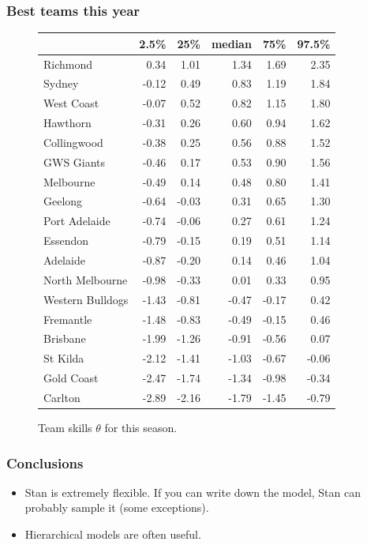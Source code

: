 \documentclass{beamer}
\begin{document}
\begin{frame}
	\frametitle{Best teams this year}
	\begin{figure}
	\tiny
	\begin{tabular}{lrrrrr}
\toprule
{} &  2.5\% &   25\% &  median &   75\% &  97.5\% \\
\midrule
Richmond         &  0.34 &  1.01 &    1.34 &  1.69 &   2.35 \\
Sydney           & -0.12 &  0.49 &    0.83 &  1.19 &   1.84 \\
West Coast       & -0.07 &  0.52 &    0.82 &  1.15 &   1.80 \\
Hawthorn         & -0.31 &  0.26 &    0.60 &  0.94 &   1.62 \\
Collingwood      & -0.38 &  0.25 &    0.56 &  0.88 &   1.52 \\
GWS Giants       & -0.46 &  0.17 &    0.53 &  0.90 &   1.56 \\
Melbourne        & -0.49 &  0.14 &    0.48 &  0.80 &   1.41 \\
Geelong          & -0.64 & -0.03 &    0.31 &  0.65 &   1.30 \\
Port Adelaide    & -0.74 & -0.06 &    0.27 &  0.61 &   1.24 \\
Essendon         & -0.79 & -0.15 &    0.19 &  0.51 &   1.14 \\
Adelaide         & -0.87 & -0.20 &    0.14 &  0.46 &   1.04 \\
North Melbourne  & -0.98 & -0.33 &    0.01 &  0.33 &   0.95 \\
Western Bulldogs & -1.43 & -0.81 &   -0.47 & -0.17 &   0.42 \\
Fremantle        & -1.48 & -0.83 &   -0.49 & -0.15 &   0.46 \\
Brisbane         & -1.99 & -1.26 &   -0.91 & -0.56 &   0.07 \\
St Kilda         & -2.12 & -1.41 &   -1.03 & -0.67 &  -0.06 \\
Gold Coast       & -2.47 & -1.74 &   -1.34 & -0.98 &  -0.34 \\
Carlton          & -2.89 & -2.16 &   -1.79 & -1.45 &  -0.79 \\
\bottomrule
\end{tabular}	
\caption{Team skills $\theta$ for this season.}
\end{figure}
\end{frame}

\begin{frame}
\frametitle{Conclusions}
\begin{itemize}
	\item Stan is extremely flexible. If you can write down the model, Stan can probably sample it (some exceptions).
	\item Hierarchical models are often useful.
\end{itemize}
\end{frame}
\end{document}
